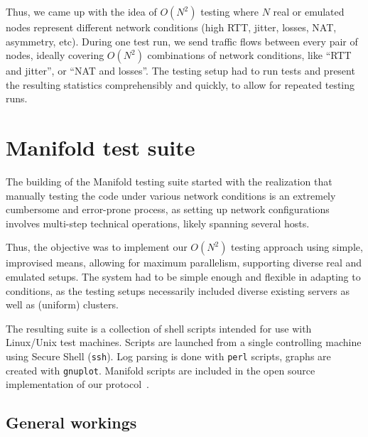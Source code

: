 \documentclass[conference]{IEEEtran}
\begin{document}
Thus, we came up with the idea of $O(N^{2})$ testing where $N$ real or emulated nodes represent different network conditions (high RTT, jitter, losses, NAT, asymmetry, etc). During one test run, we send traffic flows between every pair of nodes, ideally covering $O(N^{2})$ combinations of network conditions, like ``RTT and jitter'', or ``NAT and losses''.
The testing setup had to run tests and present the resulting statistics comprehensibly and quickly, to allow for repeated testing runs.

\section{Manifold test suite}


The building of the Manifold testing suite started with the realization that manually testing the code under various network conditions is an extremely cumbersome and error-prone process, as setting up network configurations involves multi-step technical operations, likely spanning several hosts.

Thus, the objective was to implement our $O(N^{2})$ testing approach using simple, improvised means, allowing for maximum parallelism, supporting diverse  real and emulated setups. The system had to be simple enough and flexible in adapting to conditions, as the testing setups necessarily included diverse existing servers as well as (uniform) clusters.	

The resulting suite is a collection of shell scripts intended for use
with Linux/Unix test machines. Scripts are launched from a single controlling
machine using Secure Shell ({\tt ssh}).
Log parsing is done with {\tt perl} scripts, graphs are created with {\tt gnuplot}. Manifold scripts are included in the open source implementation of our protocol~\cite{libswift}.


\subsection{General workings}
\end{document}
